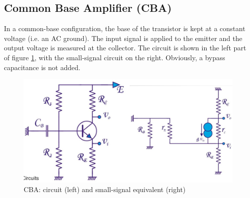 \subsection{Common Base Amplifier (CBA)}
\label{sec:cba}
In a common-base configuration, the base of the transistor is kept at a constant voltage (i.e. an AC ground). The input signal is applied to the emitter and the output voltage is measured at the collector. The circuit is shown in the left part of figure \ref{fig:amplifier8}, with the small-signal circuit on the right. Obviously, a bypass capacitance is not added.

\begin{figure}[h!]
	\centering
	\includegraphics[width=14cm]{figures/ch02/amplifier8.jpg}
	\caption{CBA: circuit (left) and small-signal equivalent (right)}
	\label{fig:amplifier8}
\end{figure}

